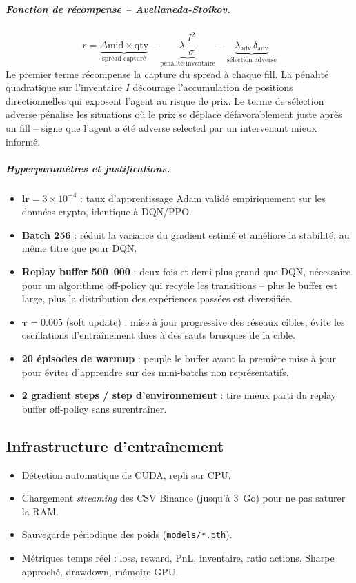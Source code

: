 \documentclass[11pt,a4paper]{article}
\begin{document}
\subparagraph{Fonction de récompense -- Avellaneda-Stoikov.}
\[
r = \underbrace{\Delta\text{mid} \times \text{qty}}_{\text{spread capturé}}
  - \underbrace{\lambda\,\frac{I^2}{\sigma}}_{\text{pénalité inventaire}}
  - \underbrace{\lambda_{\text{adv}}\,\delta_{\text{adv}}}_{\text{sélection adverse}}
\]
Le premier terme récompense la capture du spread à chaque fill.
La pénalité quadratique sur l'inventaire $I$ décourage l'accumulation
de positions directionnelles qui exposent l'agent au risque de prix.
Le terme de sélection adverse pénalise les situations où le prix
se déplace défavorablement juste après un fill -- signe que l'agent
a été adverse selected par un intervenant mieux informé.

\subparagraph{Hyperparamètres et justifications.}
\begin{itemize}[leftmargin=1.2cm]
  \item $\textbf{lr} = 3\times10^{-4}$ : taux d'apprentissage Adam
        validé empiriquement sur les données crypto, identique à DQN/PPO.
  \item \textbf{Batch 256} : réduit la variance du gradient estimé et
        améliore la stabilité, au même titre que pour DQN.
  \item \textbf{Replay buffer 500~000} : deux fois et demi plus grand
        que DQN, nécessaire pour un algorithme off-policy qui recycle
        les transitions -- plus le buffer est large, plus la distribution
        des expériences passées est diversifiée.
  \item $\boldsymbol{\tau = 0.005}$ (soft update) : mise à jour
        progressive des réseaux cibles, évite les oscillations
        d'entraînement dues à des sauts brusques de la cible.
  \item \textbf{20 épisodes de warmup} : peuple le buffer avant la
        première mise à jour pour éviter d'apprendre sur des mini-batchs
        non représentatifs.
  \item \textbf{2 gradient steps / step d'environnement} : tire
        mieux parti du replay buffer off-policy sans surentraîner.
\end{itemize}

\subsection{Infrastructure d'entraînement}

\begin{itemize}[leftmargin=1.2cm]
    \item Détection automatique de CUDA, repli sur CPU.
    \item Chargement \textit{streaming} des CSV Binance
          (jusqu'à 3~Go) pour ne pas saturer la RAM.
    \item Sauvegarde périodique des poids
          (\texttt{models/*.pth}).
    \item Métriques temps réel : loss, reward, PnL,
          inventaire, ratio actions, Sharpe approché,
          drawdown, mémoire GPU.
\end{itemize}
\end{document}
